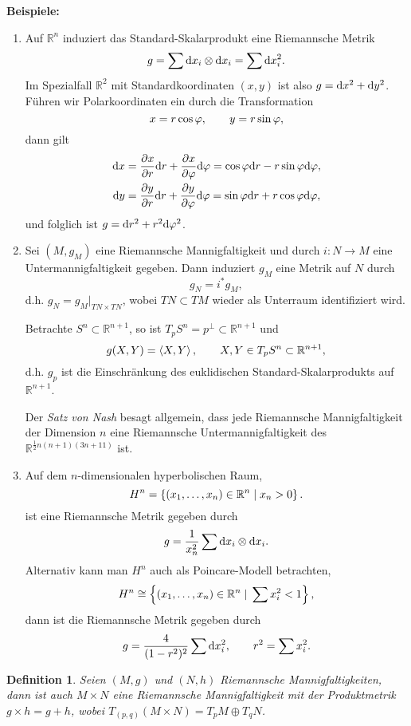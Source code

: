 \documentclass[12pt,a4paper]{article}
\def\R{\mathbb{R}}
\newtheorem{Definition}[Lemma]{Definition}
\begin{document}
{\bf Beispiele:} 
\begin{enumerate}
  \item Auf $\R^n$ induziert das Standard-Skalarprodukt eine
Riemannsche Metrik
$$
g = \sum \mathrm{d}x_i \otimes \mathrm{d}x_i = \sum \mathrm{d}x_i^2.
$$
Im Spezialfall $\R^2$ mit Standardkoordinaten $(x,y)$ ist also $g= \mathrm{d}x^2 +
\mathrm{d}y^2$. F\"uhren wir Polarkoordinaten ein durch die Transformation
$$
x = r\cos \varphi,\qquad y = r\sin\varphi,
$$
dann gilt
\begin{align*}
\mathrm{d}x &= \frac{\partial x}{\partial r}\mathrm{d}r + \frac{\partial x}{\partial \varphi}\mathrm{d}\varphi =
\cos\varphi \mathrm{d}r - r\sin\varphi \mathrm{d}\varphi,\\
\mathrm{d}y &= \frac{\partial y}{\partial r}\mathrm{d}r + \frac{\partial y}{\partial \varphi}\mathrm{d}\varphi =
\sin\varphi \mathrm{d}r + r\cos\varphi \mathrm{d}\varphi,
\end{align*}
und folglich ist $g = \mathrm{d}r^2 + r^2\mathrm{d}\varphi^2$.

\item Sei $(M,g_M)$ eine Riemannsche Mannigfaltigkeit und durch $i: N\to M$ eine
Untermannigfaltigkeit gegeben. Dann induziert $g_M$ eine Metrik auf $N$ durch
$$
g_N = i^* g_M,
$$
d.h. $g_N = g_M\big|_{TN\times TN}$, wobei $TN\subset TM$ wieder als Unterraum
identifiziert wird.

Betrachte $S^n\subset\R^{n+1}$, so ist $T_p S^n = p^\bot \subset\R^{n+1}$ und
$$
g(X,Y) = \scp{X,Y},\qquad X,Y\in T_pS^n\subset\R^{n+1},
$$
d.h. $g_p$ ist die Einschr\"ankung des euklidischen Standard-Skalarprodukts auf
$\R^{n+1}$.

Der \textit{Satz von Nash} besagt allgemein, dass jede Riemannsche
Mannigfaltigkeit der Dimension $n$ eine Riemannsche Untermannigfaltigkeit des
$\R^{\frac{1}{2}n(n+1)(3n+11)}$ ist.
\item Auf dem $n$-dimensionalen hyperbolischen Raum,
$$
H^n = \setdef{(x_1,\ldots,x_n)\in\R^n}{x_n > 0}.
$$
ist eine Riemannsche Metrik gegeben durch
$$
g = \frac{1}{x_n^2}\sum \mathrm{d}x_i \otimes \mathrm{d}x_i.
$$
Alternativ kann man $H^n$ auch als Poincare-Modell betrachten,
$$
H^n\cong \setdef{(x_1,\ldots,x_n)\in\R^n}{\sum x_i^2 < 1},
$$
dann ist die Riemannsche Metrik gegeben durch
$$
g = \frac{4}{(1-r^2)^2}\sum\mathrm{d}x_i^2,\qquad r^2 = \sum x_i^2.
$$ 
\end{enumerate}

\bigskip

\begin{Definition}
Seien $(M,g)$ und $(N,h)$ Riemannsche Mannigfaltigkeiten, dann ist auch
$M\times N$ eine Riemannsche Mannigfaltigkeit mit der Produktmetrik $g\times h
= g+h$, wobei $T_{(p,q)} (M\times N) = T_pM \oplus T_qN$.
\end{Definition}
\end{document}
